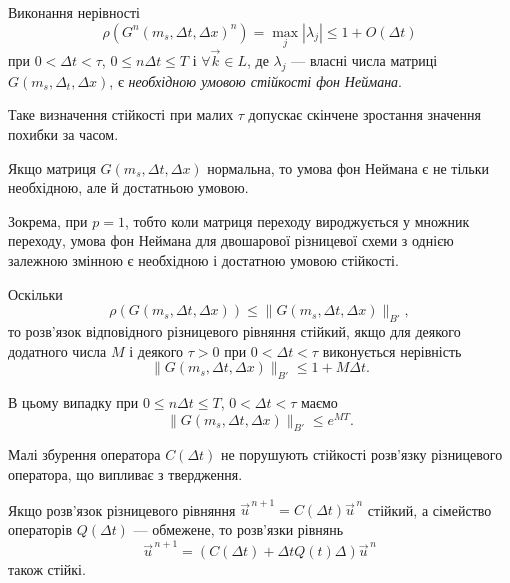 \begin{proposition}
    Виконання нерівності 
    \begin{equation*}
        \rho (G^n(m_s, \Delta t, \Delta x)^n ) = \max_j |\lambda_j| \le 1 + O(\Delta t)
    \end{equation*}
    при $0 < \Delta t < \tau$, $0 \le n \Delta t \le T$  і $\forall \vec k \in L$, де $\lambda_j$ --- власні числа матриці $G(m_s, \Delta_t, \Delta x)$, є \emph{необхідною умовою стійкості фон Неймана}. 
\end{proposition}

Таке визначення стійкості при малих $\tau$ допускає скінчене зростання значення похибки за часом. \medskip

Якщо матриця $G(m_s, \Delta t, \Delta x)$ нормальна, то умова фон Неймана є не тільки необхідною, але й достатньою умовою. \medskip

Зокрема, при $p = 1$, тобто коли матриця переходу вироджується у множник переходу, умова фон Неймана для двошарової різницевої схеми з однією залежною змінною є необхідною і достатною умовою стійкості. \medskip

Оскільки 
\begin{equation*}
     \rho (G(m_s, \Delta t, \Delta x) ) \le  \| G(m_s, \Delta t, \Delta x) \|_{B'},
\end{equation*}
то розв'язок відповідного різницевого рівняння стійкий, якщо для деякого додатного числа $M$ і деякого $\tau > 0$ при $0 < \Delta t < \tau$ виконується нерівність
\begin{equation}
    \label{eq:4.11}
    \| G(m_s, \Delta t, \Delta x) \|_{B'} \le 1 + M \Delta t.
\end{equation}

В цьому випадку при $0 \le n \Delta t \le T$, $0 < \Delta t < \tau$ маємо  
\begin{equation*}
    \| G(m_s, \Delta t, \Delta x) \|_{B'} \le e^{M T}.
\end{equation*}

Малі збурення оператора $C(\Delta t)$ не порушують стійкості розв'язку різницевого оператора, що випливає з твердження.

\begin{theorem}[Крайса]
    Якщо розв'язок різницевого рівняння $\vec u^{\,n + 1} = C(\Delta t) \vec u^{\,n}$ стійкий, а сімейство операторів $Q(\Delta t)$ --- обмежене, то розв'язки рівнянь 
	\begin{equation*}
	    \vec u^{\,n+1} = ( C(\Delta t) + \Delta t Q(t) \Delta) \vec u^{\,n}
	\end{equation*}
    також стійкі.
\end{theorem}

